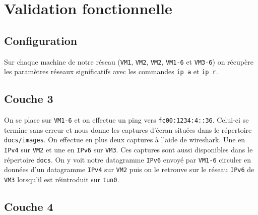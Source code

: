 \documentclass[a4paper, 12pt]{article}
\begin{document}
    \section{Validation fonctionnelle}

    \subsection{Configuration}

    Sur chaque machine de notre réseau (\verb+VM1+, \verb+VM2+, \verb+VM2+, 
    \verb+VM1-6+ et \verb+VM3-6+) on récupère les paramètres réseaux 
    significatifs avec les commandes \verb+ip a+ et \verb+ip r+. 

    \subsection{Couche 3}

    On se place sur \verb+VM1-6+ et on effectue un ping vers \verb+fc00:1234:4::36+.
    Celui-ci se termine sans erreur et nous donne les captures d'écran situées dans 
    le répertoire \verb+docs/images+. On effectue en plus deux captures à l'aide de 
    wireshark. Une en \verb+IPv4+ sur \verb+VM2+ et une en \verb+IPv6+ sur \verb+VM3+.
    Ces captures sont aussi disponibles dans le répertoire \verb+docs+. On y voit 
    notre datagramme \verb+IPv6+ envoyé par \verb+VM1-6+ circuler en données d'un 
    datagramme \verb+IPv4+ sur \verb+VM2+ puis on le retrouve sur le réseau 
    \verb+IPv6+ de \verb+VM3+ lorsqu'il est réintroduit sur \verb+tun0+.

    \subsection{Couche 4}
\end{document}
